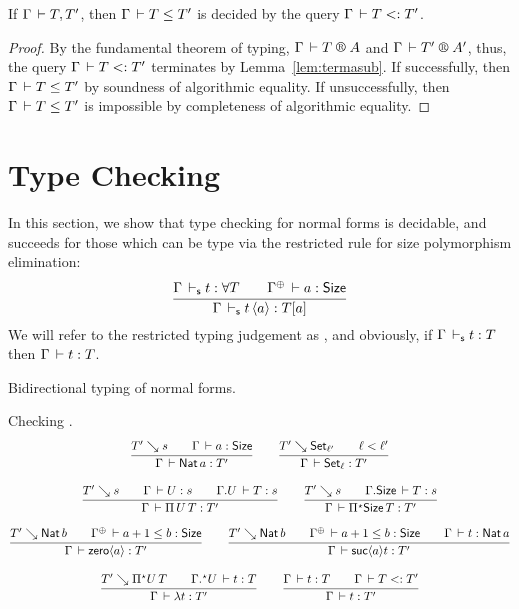 \documentclass[acmlarge,review,anonymous]{acmart}\settopmatter{printfolios=true}
\begin{document}
\begin{theorem}
  If\/ $\Gamma \,\vdash T,T'$, then $\Gamma \,\vdash T \leq T'$ is decided by the query $\Gamma \,\vdash T \mathrel{{<}{:}} T'$.
\end{theorem}
\begin{proof}
  By the fundamental theorem of typing, $\RG \Gamma T A$ and $\RG \Gamma {T'} {A'}$,
  thus, the query  $\Gamma \,\vdash T \mathrel{{<}{:}} T'$ terminates by Lemma~\ref{lem:termasub}.
  If successfully, then $\Gamma \,\vdash T \leq T'$ by soundness of algorithmic equality.
  If unsuccessfully, then $\Gamma \,\vdash T \leq T'$ is impossible by completeness of algorithmic equality.
\end{proof}


\section{Type Checking}
\label{sec:tycheck}

In this section, we show that type checking for normal forms is decidable, and succeeds for those which can be type via the restricted rule for size polymorphism elimination:
\[
  \ru{\Gamma \ders t : \forall T \qquad
      \resurrect\Gamma \der a : \Size
    }{\Gamma \ders t\, \ann a : T[a]}
\]
We will refer to the restricted typing judgement as , and obviously,
if\/ $\Gamma \,\vdash_\mathsf{s} t : T$ then $\Gamma \,\vdash t : T$.

Bidirectional typing of normal forms.

Checking .
\begin{gather*}
  \ru{T' \evalsto s \qquad
      \Gamma \der a : \Size
    }{\Gamma \der \Nat a \jchk T'}
\qquad
  \ru{T' \evalsto \Set[\ell'] \qquad \ell < \ell'
    }{\Gamma \der \Set[\ell] \jchk T'}
\\[2ex]
  \ru{T' \evalsto s \qquad
      \Gamma \der U \jchk s \qquad
      \cext \Gamma U \der T \jchk s
    }{\Gamma \der \piT U T \jchk T'}
\qquad
  \ru{T' \evalsto s \qquad
      \cext \Gamma \Size \der T \jchk s
    }{\Gamma \der \epiT \Size T \jchk T'}
\\[2ex]
  \ru{T' \evalsto \Nat b \qquad
      \resurrect \Gamma \der a+1 \leq b : \Size
    }{\Gamma \der \zero a \jchk T'}
\qquad
  \ru{T' \evalsto \Nat b \qquad
      \resurrect \Gamma \der a+1 \leq b : \Size \qquad
      \Gamma \der t \jchk \Nat a
    }{\Gamma \der \suc a t \jchk T'}
\\[2ex]
  \ru{T' \evalsto \epiT U T \qquad
      \eext \Gamma U \der t \jchk T
    }{\Gamma \der \lambda t \jchk T'}
\qquad
  \ru{\Gamma \der t \jinf T \qquad \Gamma \der T \asub T'
    }{\Gamma \der t \jchk T'}
\end{gather*}
\end{document}

